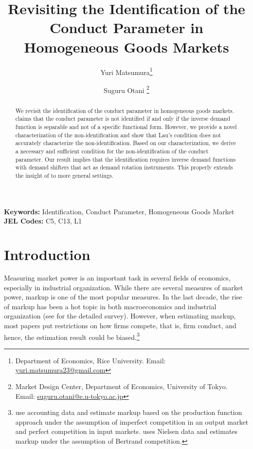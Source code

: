 \documentclass[11pt, a4paper]{article}
\title{Revisiting the Identification of the Conduct Parameter in Homogeneous Goods Markets}
\author{Yuri Matsumura\thanks{Department of Economics, Rice University. Email: \href{mailto:yuri.matsumura23@gmail.com}{yuri.matsumura23@gmail.com}} \and Suguru Otani \thanks{Market Design Center, Department of Economics, University of Tokyo. Email: \href{mailto:suguru.otani@e.u-tokyo.ac.jp}{suguru.otani@e.u-tokyo.ac.jp}
}}
\begin{document}
\maketitle
\begin{abstract}
    We revisit the identification of the conduct parameter in homogeneous goods markets. 
    \citet{lauIdentifying1982} claims that the conduct parameter is not identified if and only if the inverse demand function is separable and not of a specific functional form. 
    However, we provide a novel characterization of the non-identification and show that Lau's condition does not accurately characterize the non-identification.
    Based on our characterization, we derive a necessary and sufficient condition for the non-identification of the conduct parameter. 
    Our result implies that the identification requires inverse demand functions with demand shifters that act as demand rotation instruments. 
    This properly extends the insight of \citet{bresnahanOligopoly1982} to more general settings.
\end{abstract}

\noindent\textbf{Keywords:} Identification, Conduct Parameter, Homogeneous Goods Market
\vspace{0in}
\newline
\noindent\textbf{JEL Codes:} C5, C13, L1



\newpage
\section{Introduction}
Measuring market power is an important task in several fields of economics, especially in industrial organization.
While there are several measures of market power, markup is one of the most popular measures.
In the last decade, the rise of markup has been a hot topic in both macroeconomics and industrial organization (see \citet{millerIndustrial2025} for the detailed survey).
However, when estimating markup, most papers put restrictions on how firms compete, that is, firm conduct, and hence, the estimation result could be biased.\footnote{
\citet{deloeckerRise2020} use accounting data and estimate markup based on the production function approach under the assumption of imperfect competition in an output market and perfect competition in input markets.
\citet{dopperRising2021} uses Nielsen data and estimates markup under the assumption of Bertrand competition.}
\end{document}
